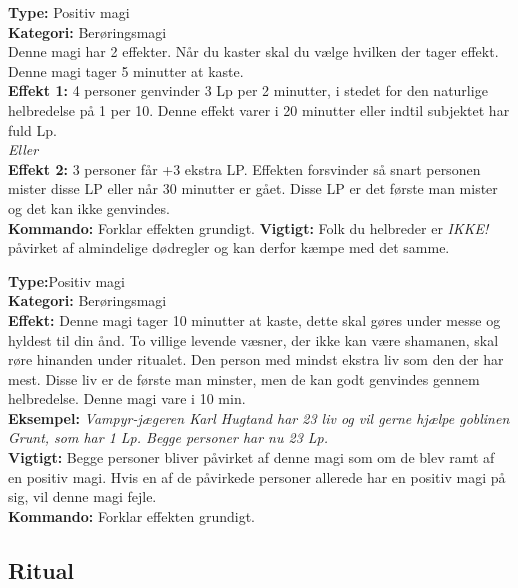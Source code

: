 \begin{åndens gave*}
\textbf{Type:} Positiv magi\\
\textbf{Kategori:} Berøringsmagi\\
Denne magi har 2 effekter. Når du kaster skal du vælge hvilken der tager effekt. Denne magi tager 5 minutter at kaste.\\
\textbf{Effekt 1:} 4 personer genvinder 3 Lp per 2 minutter, i stedet for den naturlige helbredelse på 1 per 10. Denne effekt varer i 20 minutter eller indtil subjektet har fuld Lp.\\
\emph{\textit{Eller}}\\
\textbf{Effekt 2:} 3 personer får +3 ekstra LP. Effekten forsvinder så snart personen mister disse LP eller når 30 minutter er gået. Disse LP er det første man mister og det kan ikke genvindes.\\
\textbf{Kommando:} Forklar effekten grundigt.
\textbf{Vigtigt:} Folk du helbreder er \emph{IKKE!} påvirket af almindelige dødregler og kan derfor kæmpe med det
samme.
\end{åndens gave*}

\begin{åndens gave*}
\textbf{Type:}Positiv magi \\
\textbf{Kategori:} Berøringsmagi\\
\textbf{Effekt:} Denne magi tager 10 minutter at kaste, dette skal gøres under messe og hyldest til din ånd. To villige levende væsner, der ikke kan være shamanen, skal røre hinanden under ritualet. Den person med mindst ekstra liv som den der har mest. Disse liv er de første man minster, men de kan godt genvindes gennem helbredelse. Denne magi vare i 10 min.\\
\textbf{Eksempel:} \textit{Vampyr-jægeren Karl Hugtand har 23 liv og vil gerne hjælpe goblinen Grunt, som har 1
Lp. Begge personer har nu 23 Lp.}\\
\textbf{Vigtigt:} Begge personer bliver påvirket af denne magi som om de blev ramt af en positiv magi. Hvis en af de påvirkede personer allerede har en positiv magi på sig, vil denne magi fejle.\\
\textbf{Kommando:} Forklar effekten grundigt.
\end{åndens gave*}

\subsection{Ritual}

